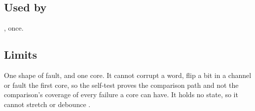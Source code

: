 \subsection*{Used by}

, once.

\subsection*{Limits}

One shape of fault, and one core. It cannot corrupt a word, flip a bit
in a channel or fault the first core, so the self-test proves the
comparison path and not the comparison's coverage of every failure a
core can have. It holds no state, so it cannot stretch or debounce
.
